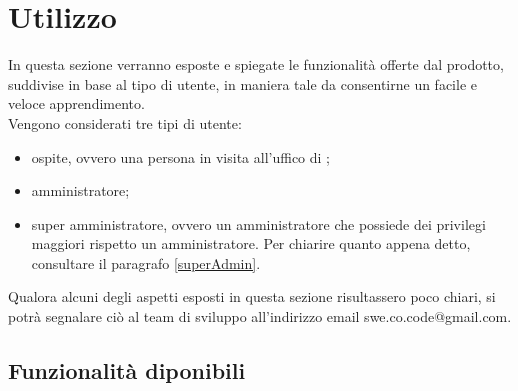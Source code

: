 \section{Utilizzo}
In questa sezione verranno esposte e spiegate le funzionalità offerte dal prodotto, suddivise in base al tipo di utente, in maniera tale da consentirne un facile e veloce apprendimento. \\
Vengono considerati tre tipi di utente:
\begin{itemize}
	\item ospite, ovvero una persona in visita all'uffico di \PROPONENTE;
	\item amministratore;
	\item super amministratore, ovvero un amministratore che possiede dei privilegi maggiori rispetto un amministratore. Per chiarire quanto appena detto, consultare il paragrafo \ref{superAdmin}.
\end{itemize}

Qualora alcuni degli aspetti esposti in questa sezione risultassero poco chiari, si potrà segnalare ciò al team di sviluppo \GRUPPO{} all'indirizzo email swe.co.code@gmail.com. 
\subsection{Funzionalità diponibili}
